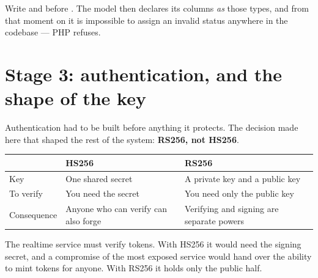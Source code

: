 Write  and  before
. The model then declares its columns \emph{as} those types, and
from that moment on it is impossible to assign an invalid status anywhere in the
codebase --- PHP refuses.


\section{Stage 3: authentication, and the shape of the key}

Authentication had to be built before anything it protects. The decision made
here that shaped the rest of the system: \textbf{RS256, not HS256}.

\begin{center}
\begin{tabular}{@{}>{\raggedright\arraybackslash}p{2.6cm}>{\raggedright\arraybackslash}p{4.6cm}p{6.4cm}@{}}
\toprule
& \textbf{HS256} & \textbf{RS256} \\
\midrule
Key & One shared secret & A private key and a public key \\
To verify & You need the secret & You need only the public key \\
Consequence & Anyone who can verify can also forge & Verifying and signing are separate powers \\
\bottomrule
\end{tabular}
\end{center}

The realtime service must verify tokens. With HS256 it would need the signing
secret, and a compromise of the most exposed service would hand over the ability
to mint tokens for anyone. With RS256 it holds only the public half.


